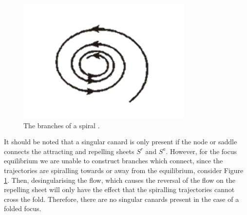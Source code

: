 \begin{figure}[h!]\centering
	\includegraphics{Images/spiral3}
	\caption{The branches of a spiral \citep{Spiral}.}
	\label{fig: spiral}
\end{figure}\newpage

It should be noted that a singular canard is only present if the node or saddle connects the attracting and repelling sheets $ S^r $ and $ S^a $.
However, for the focus equilibrium we are unable to construct branches which connect, since the trajectories are spiralling towards or away from the equilibrium, consider Figure \ref{fig: spiral}. Then, desingularising the flow, which causes the reversal of the flow on the repelling sheet will only have the effect that the spiralling trajectories cannot cross the fold. Therefore, there are no singular canards present in the case of a folded focus.\\

